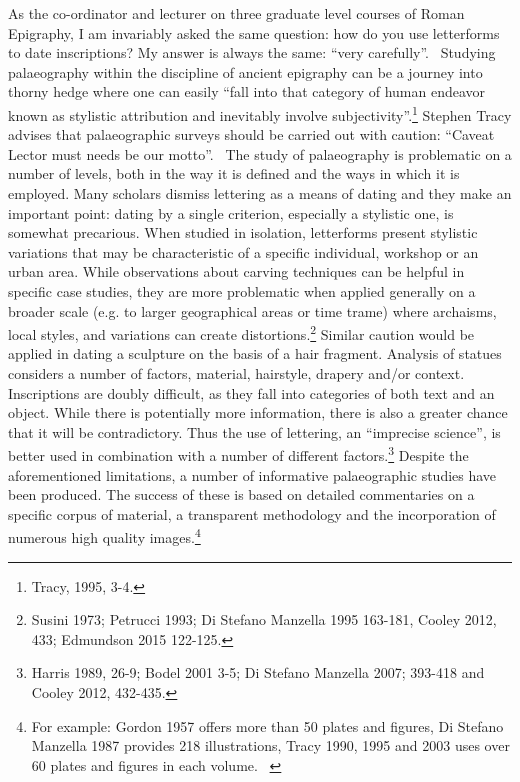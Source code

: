 \documentclass[amsthm,ebook]{saparticle}
\begin{document}
\bigskip

As the co-ordinator and lecturer on three graduate level courses of Roman Epigraphy, I am invariably asked the same
question: how do you use letterforms to date inscriptions? My answer is always the same: “very carefully”. \ Studying
palaeography within the discipline of ancient epigraphy can be a journey into thorny hedge where one can easily “fall
into that category of human endeavor known as stylistic attribution and inevitably involve subjectivity”.\footnote{
Tracy, 1995, 3-4. } Stephen Tracy advises that palaeographic surveys should be carried out with caution: “Caveat Lector
must needs be our motto”. \ The study of palaeography is problematic on a number of levels, both in the way it is
defined and the ways in which it is employed. Many scholars dismiss lettering as a means of dating and they make an
important point: dating by a single criterion, especially a stylistic one, is somewhat precarious. When studied in
isolation, letterforms present stylistic variations that may be characteristic of a specific individual, workshop or an
urban area. While observations about carving techniques can be helpful in specific case studies, they are more
problematic when applied generally on a broader scale (e.g. to larger geographical areas or time trame) where
archaisms, local styles, and variations can create distortions.\footnote{ Susini 1973; Petrucci 1993; Di Stefano
Manzella 1995 163-181, Cooley 2012, 433; Edmundson 2015 122-125.} Similar caution would be applied in dating a
sculpture on the basis of a hair fragment. Analysis of statues considers a number of factors, material, hairstyle,
drapery and/or context. Inscriptions are doubly difficult, as they fall into categories of both text and an object.
While there is potentially more information, there is also a greater chance that it will be contradictory. Thus the use
of lettering, an “imprecise science”, is better used in combination with a number of different factors.\footnote{
Harris 1989, 26-9; Bodel 2001 3-5; Di Stefano Manzella 2007; 393-418 and Cooley 2012, 432-435. } Despite the
aforementioned limitations, a number of informative palaeographic studies have been produced. The success of these is
based on detailed commentaries on a specific corpus of material, a transparent methodology and the incorporation of
numerous high quality images.\footnote{ For example: Gordon 1957 offers more than 50 plates and figures, Di Stefano
Manzella 1987 provides 218 illustrations, Tracy 1990, 1995 and 2003 uses over 60 plates and figures in each volume. \ }
\end{document}
